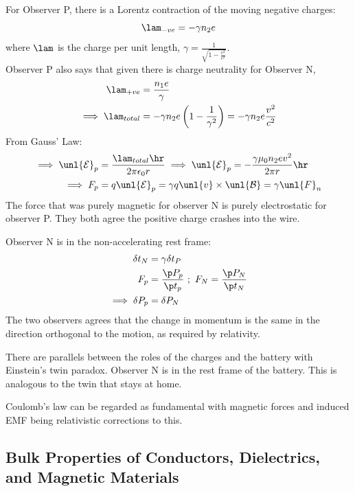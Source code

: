 \documentclass[a4paper, 11pt, normalem]{report}
\renewcommand\E{\mathcal{E}}
\newcommand\uE{\unl{\E}}
\renewcommand\B{\mathcal{B}}
\newcommand\uB{\unl{\B}}
\newcommand\eno{\epsilon_0}
\begin{document}
\chapter{}
For Observer P, there is a Lorentz contraction of the moving negative charges:
\begin{equation}
    \lam_{-ve} = -\gamma n_2e
\end{equation}
where $\lam$ is the charge per unit length, $\gamma = \frac{1}{\sqrt{1 - \tfrac{v^2}{c^2}}}$. \\
Observer P also says that given there is charge neutrality for Observer N,
\begin{align}
    \lam_{+ve} &= \frac{n_1 e}{\gamma} \\
    \implies \lam_{total} &= -\gamma n_2e \left(1 - \frac{1}{\gamma^2}\right) = -\gamma n_2e\frac{v^2}{c^2}
\end{align}
From Gauss' Law:
\begin{align}
    \implies \uE_p &= \frac{\lam_{total}\hr}{2\pi\eno r} \implies \uE_p = -\frac{\gamma \mu_0n_2ev^2}{2\pi r}\hr \\
    \implies F_p &= q\uE_p = \gamma q\unl{v} \times \uB = \gamma \unl{F}_n
\end{align}
The force that was purely magnetic for observer N is purely electrostatic for observer P.
They both agree the positive charge crashes into the wire.

Observer N is in the non-accelerating rest frame:
\begin{align}
    \delta t_N &= \gamma \delta t_P \\
    F_p &= \frac{\p P_p}{\p t_p} ~;~ F_N = \frac{\p P_N}{\p t_N} \\
    \implies \delta P_p &= \delta P_N
\end{align}
The two observers agrees that the change in momentum is the same in the direction orthogonal to the motion, as required by relativity.

There are parallels between the roles of the charges and the battery with Einstein's twin paradox.
Observer N is in the rest frame of the battery.
This is analogous to the twin that stays at home.

Coulomb's law can be regarded as fundamental with magnetic forces and induced EMF being relativistic corrections to this.

\section{Bulk Properties of Conductors, Dielectrics, and Magnetic Materials}
\end{document}
